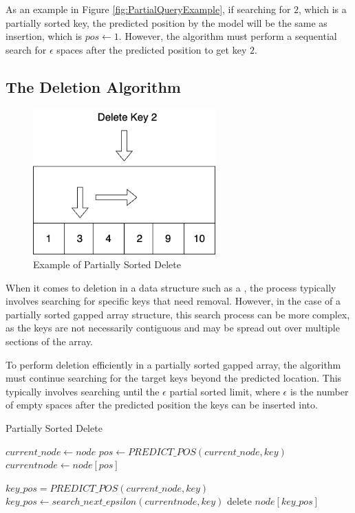 As an example in Figure \ref{fig:PartialQueryExample}, if searching for $2$, which is a partially sorted key, the predicted position by the model will be the same as insertion, which is $pos \gets 1$. However, the algorithm must perform a sequential search for $\epsilon$ spaces after the predicted position to get key $2$.


\subsection{The Deletion Algorithm}

\begin{figure}[H]
    \centering
    \includegraphics[width=70mm,scale=1]{Figures/PartialSortedDelete.png}
    \caption{
     Example of Partially Sorted Delete
    }
    \label{fig:PartialSortedDeleteExample}
\end{figure}
When it comes to deletion in a data structure such as a \learnindex, the process typically involves searching for specific keys that need removal. However, in the case of a partially sorted gapped array structure, this search process can be more complex, as the keys are not necessarily contiguous and may be spread out over multiple sections of the array.

To perform deletion efficiently in a partially sorted gapped array, the \learnindex algorithm must continue searching for the target keys beyond the predicted location. This typically involves searching until the $\epsilon$ partial sorted limit, where $\epsilon$ is the number of empty spaces after the predicted position the keys can be inserted into.
\begin{algorithm}
\caption{Partially Sorted Delete}
\begin{algorithmic}[1]
\State $current\_node \gets node$
\State $pos \gets PREDICT\_POS(current\_node, key)$
    \State $current node \gets node[pos]$
    
\Else
    \State $key\_pos = PREDICT\_POS(current\_node, key)$
        \State $key\_pos \gets search\_next\_epsilon(current node, key)$
    \EndIf
    \State delete $node[key\_pos]$
\EndIf
\EndWhile
\EndProcedure
\end{algorithmic}
\end{algorithm}

